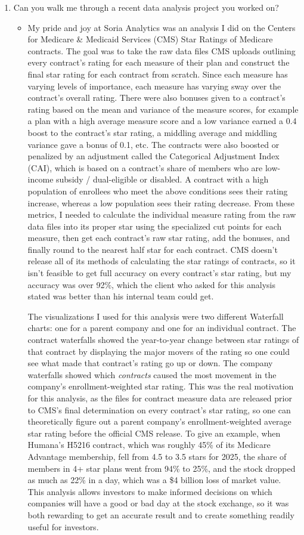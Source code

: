 \documentclass[11pt]{article}
\newcommand{\answer}[1]{%
  \par\vspace{0.35em}%
  \begin{itemize}[label={},leftmargin=1.5em,topsep=0pt,partopsep=0pt,parsep=0pt,itemsep=0pt]
    \item #1
  \end{itemize}%
  \vspace{0.35em}%
}
\begin{document}
\begin{enumerate}[leftmargin=*]
    \item Can you walk me through a recent data analysis project you worked on?
    \answer{My pride and joy at Soria Analytics was an analysis I did on the Centers for Medicare \& Medicaid Services
    (CMS) Star Ratings of Medicare contracts. The goal was to take the raw data files CMS uploads outlining every contract's 
    rating for each measure of their plan and construct the final star rating for each contract from scratch. Since 
    each measure has varying levels of importance, each measure has varying sway over the contract's overall rating. There 
    were also bonuses given to a contract's rating based on the mean and variance of the measure scores, for example a plan 
    with a high average measure score and a low variance earned a 0.4 boost to the contract's star rating, a middling average 
    and middling variance gave a bonus of 0.1, etc. The contracts were also boosted or penalized by an adjustment called the Categorical Adjustment 
    Index (CAI), which is based on a contract's share of members who are low-income subsidy / dual-eligible or disabled. A 
    contract with a high population of enrollees who meet the above conditions sees their rating increase, whereas a low
    population sees their rating decrease. From these metrics, I needed to calculate the individual measure rating from the 
    raw data files into its proper star using the specialized cut points for each measure, then get each
    contract's raw star rating, add the bonuses, and finally round to the nearest half star for each contract.
    CMS doesn't release all of its methods of calculating the star ratings of contracts, so it isn't feasible to get
    full accuracy on every contract's star rating, but my accuracy was over 92\%, which the client who asked for this
    analysis stated was better than his internal team could get.
    
    The visualizations I used for this analysis were two different Waterfall charts: one for a parent company and one for an 
    individual contract. The contract waterfalls showed the year-to-year change between star ratings of that contract by 
    displaying the major movers of the rating so one could see what made that contract's rating go up or down. The 
    company waterfalls showed which \textit{contracts} caused the most movement in the company's enrollment-weighted
    star rating. This was the real motivation for this analysis, as the files for contract measure data are 
    released prior to CMS's final determination on every contract's star rating, so one can theoretically figure out 
    a parent company's enrollment-weighted average star rating before the official CMS release. To give an example,
    when Humana's H5216 contract, which was roughly 45\% of its Medicare Advantage membership, fell from 4.5 to 3.5 
    stars for 2025, the share of members in 4+ star plans went from 94\% to 25\%, and the stock dropped as much as 22\% in 
    a day, which was a \$4 billion loss of market value. This analysis allows investors to make informed decisions on
    which companies will have a good or bad day at the stock exchange, so it was both rewarding to get an accurate
    result and to create something readily useful for investors.}
\end{enumerate}
\end{document}
